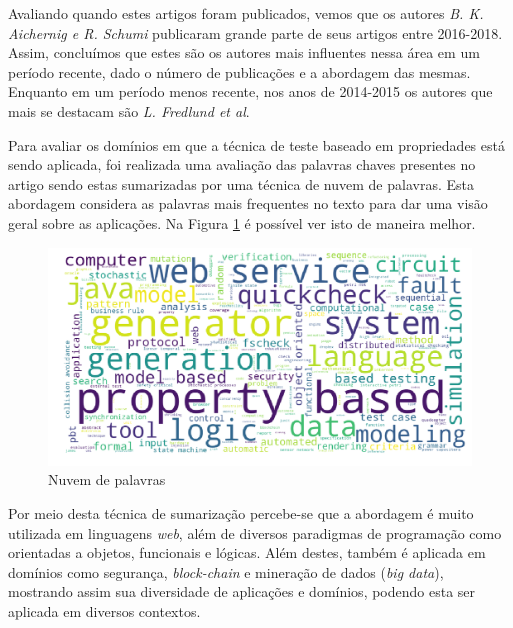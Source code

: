 	Avaliando quando estes artigos foram publicados, vemos que os autores \textit{B. K. Aichernig e R. Schumi} publicaram grande parte de seus artigos entre 2016-2018. Assim, concluímos que estes são os autores mais influentes nessa área em um período recente, dado o número de publicações e a abordagem das mesmas. Enquanto em um período menos recente, nos anos de 2014-2015 os autores que mais se destacam são \textit{L. Fredlund et al}.


	Para avaliar os domínios em que a técnica de teste baseado em propriedades está sendo aplicada, foi realizada uma avaliação das palavras chaves presentes no artigo sendo estas sumarizadas por uma técnica de nuvem de palavras. Esta abordagem considera as palavras mais frequentes no texto para dar uma visão geral sobre as aplicações. Na Figura \ref{fig:cloud} é possível ver isto de maneira melhor.

	\begin{figure}[H]
	  \centering
	  \includegraphics[scale=0.5]{Imagens/nuvem_palavras.png}
	  \caption{Nuvem de palavras}
      \label{fig:cloud}
	\end{figure}

	Por meio desta técnica de sumarização percebe-se que a abordagem é muito utilizada em linguagens \textit{web}, além de diversos paradigmas de programação como orientadas a objetos, funcionais e lógicas. Além destes, também é aplicada em domínios como segurança, \textit{block-chain} e mineração de dados (\textit{big data}), mostrando assim sua diversidade de aplicações e domínios, podendo esta ser aplicada em diversos contextos.
